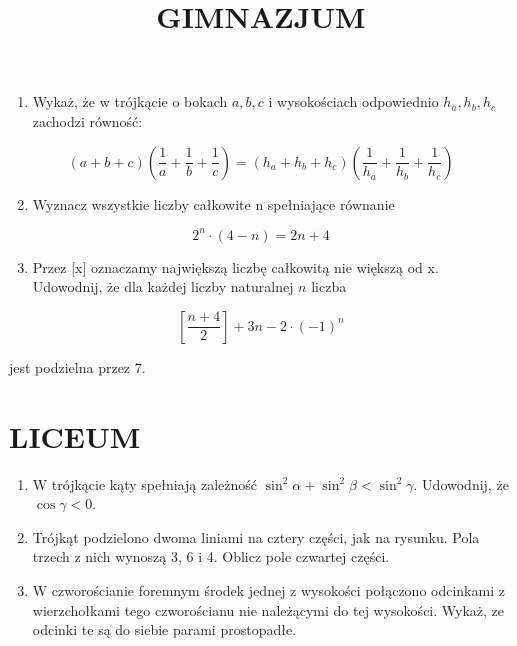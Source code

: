 \documentclass[10pt]{article}
\title{GIMNAZJUM }
\author{}
\date{}
\begin{document}
\maketitle
\begin{enumerate}
  \item Wykaż, że w trójkącie o bokach \(a, b, c\) i wysokościach odpowiednio \(h_{a}, h_{b}, h_{c}\) zachodzi równość:
\end{enumerate}

\[
(a+b+c)\left(\frac{1}{a}+\frac{1}{b}+\frac{1}{c}\right)=\left(h_{a}+h_{b}+h_{c}\right)\left(\frac{1}{h_{a}}+\frac{1}{h_{b}}+\frac{1}{h_{c}}\right)
\]

\begin{enumerate}
  \setcounter{enumi}{1}
  \item Wyznacz wszystkie liczby całkowite n spełniające równanie
\end{enumerate}

\[
2^{n} \cdot(4-n)=2 n+4
\]

\begin{enumerate}
  \setcounter{enumi}{2}
  \item Przez [x] oznaczamy największą liczbę całkowitą nie większą od x. Udowodnij, że dla każdej liczby naturalnej \(n\) liczba
\end{enumerate}

\[
\left[\frac{n+4}{2}\right]+3 n-2 \cdot(-1)^{n}
\]

jest podzielna przez 7.

\section*{LICEUM}
\begin{enumerate}
  \item W trójkącie kąty spełniają zależność \(\sin ^{2} \alpha+\sin ^{2} \beta<\sin ^{2} \gamma\). Udowodnij, że \(\cos \gamma<0\).
  \item Trójkąt podzielono dwoma liniami na cztery części, jak na rysunku. Pola trzech z nich wynoszą 3, 6 i 4. Oblicz pole czwartej części.
  \item W czworościanie foremnym środek jednej z wysokości połączono odcinkami z wierzchołkami tego czworościanu nie należącymi do tej wysokości. Wykaż, ze odcinki te są do siebie parami prostopadłe.
\end{enumerate}
\end{document}
